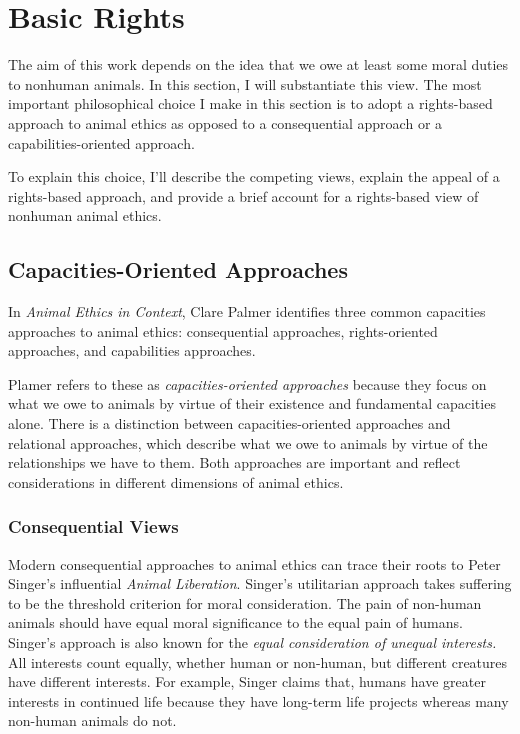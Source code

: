 \chapter{Basic Rights}

	The aim of this work depends on the idea that we owe at least some moral
	duties to nonhuman animals. In this section, I will substantiate this view.
	The most important philosophical choice I make in this section is to adopt
	a rights-based approach to animal ethics as opposed to a consequential
	approach or a capabilities-oriented approach.

	To explain this choice, I’ll describe the competing views, explain the
	appeal of a rights-based approach, and provide a brief account for a
	rights-based view of nonhuman animal ethics.

	\section{Capacities-Oriented Approaches}	

	In \emph{Animal Ethics in Context}, Clare Palmer identifies three common
	capacities approaches to animal ethics: consequential approaches,
	rights-oriented approaches, and capabilities approaches.\autocite[Ch.
	2]{palmer_animal_context}

	Plamer refers to these as \emph{capacities-oriented approaches} because
	they focus on what we owe to animals by virtue of their existence and
	fundamental capacities alone. There is a distinction between
	capacities-oriented approaches and relational approaches, which describe
	what we owe to animals by virtue of the relationships we have to them.
	Both approaches are important and reflect considerations in different
	dimensions of animal ethics.

	\subsection{Consequential Views}

	Modern consequential approaches to animal ethics can trace their roots to
	Peter Singer’s influential \emph{Animal Liberation}. Singer’s utilitarian
	approach takes suffering to be the threshold criterion for moral
	consideration.  The pain of non-human animals should have equal moral
	significance to the equal pain of humans. Singer’s approach is also known
	for the \emph{equal consideration of unequal interests.} All interests
	count equally, whether human or non-human, but different creatures have
	different interests. For example, Singer claims that, humans have greater
	interests in continued life because they have long-term life projects
	whereas many non-human animals do not.

